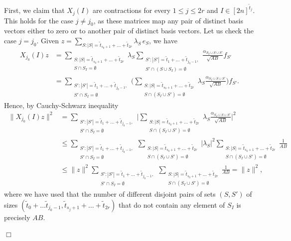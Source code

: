 \documentclass[11pt]{article}
\newcommand{\1}{\mathbf{1}}
\theoremstyle{plain}
\theoremstyle{definition}
\theoremstyle{remark}
\renewenvironment{proof}[1][]{
    	\begin{trivlist}
     	\item[\hspace{\labelsep}{\em\noindent Proof#1:\/}]}
     	{{\hfill$\Box$}
    	\end{trivlist}
  }
\begin{document}
\begin{proof}
First, we claim that $X_j(I)$ are contractions for every $1\leq j\leq 2r$ and $I\in [2n]^{\tilde t_j}$. This holds for the case $j \neq j_0$, as these matrices map any pair of distinct basis vectors either to zero or to another pair of distinct basis vectors. Let us check the case $j=j_0$. Given  $z=\sum_{S: |S|=\widetilde t_{s_0+1}+\dots+\widetilde t_{2r}}\lambda_S\, e_S$, we have 
\begin{align*}
X_{j_0}(I)z&=\sum_{\substack{S: |S|=\widetilde t_{s_0+1}+\dots+\widetilde t_{2r}\\S\cap S_I=\emptyset}}\lambda_S  \sum_{\substack{S':|S'|= \widetilde t_1+\dots+\widetilde t_{j_0-1},\\S'\cap(S\cup S_{I})=\emptyset}} \frac{\alpha_{S_I\cup S\cup S'}}{\sqrt{AB} }f_{S'} \\&=\sum_{\substack{S':|S'|= \widetilde t_1+\dots+\widetilde t_{j_0-1},\\S'\cap S_{I}=\emptyset}}\Big(\sum_{\substack{S: |S|=\widetilde t_{s_0+1}+\dots+\widetilde t_{2r}\\S\cap (S_I\cup S')=\emptyset}}\lambda_S   \frac{\alpha_{S_I\cup S\cup S'}}{\sqrt{AB} }\Big)f_{S'}.
\end{align*}
Hence, by Cauchy-Schwarz inequality
\begin{align*}\
\|X_{j_0}(I)z\|^2&=\sum_{\substack{S':|S'|= \widetilde t_1+\dots+\widetilde t_{j_0-1},\\S'\cap S_{I}=\emptyset}}\Big|\sum_{\substack{S: |S|=\widetilde t_{s_0+1}+\dots+\widetilde t_{2r}\\S\cap (S_I\cup S')=\emptyset}}\lambda_S   \frac{\alpha_{S_I\cup S\cup S'}}{\sqrt{AB} }\Big|^2\\&\leq \sum_{\substack{S':|S'|= \widetilde t_1+\dots+\widetilde t_{j_0-1},\\S'\cap S_{I}=\emptyset}}\sum_{\substack{S: |S|=\widetilde t_{s_0+1}+\dots+\widetilde t_{2r}\\S\cap (S_I\cup S')=\emptyset}}|\lambda_S|^2\sum_{\substack{S: |S|=\widetilde t_{s_0+1}+\dots+\widetilde t_{2r}\\S\cap (S_I\cup S')=\emptyset}}\frac{1}{AB}\\&\leq \|z\|^2 \sum_{\substack{S':|S'|= \widetilde t_1+\dots+\widetilde t_{j_0-1},\\S'\cap S_{I}=\emptyset}}\sum_{\substack{S: |S|=\widetilde t_{s_0+1}+\dots+\widetilde t_{2r}\\S\cap (S_I\cup S')=\emptyset}}\frac{1}{AB}=\|z\|^2,
\end{align*}where we have used that the number of different disjoint pairs of sets $(S,S')$ of sizes $(\widetilde t_0+\dots\widetilde t_{j_0-1},\widetilde t_{s_j+1}+\dots+\widetilde t_{2r})$ that do not contain any element of $S_I$ is precisely $AB$.



\end{proof}
\end{document}
